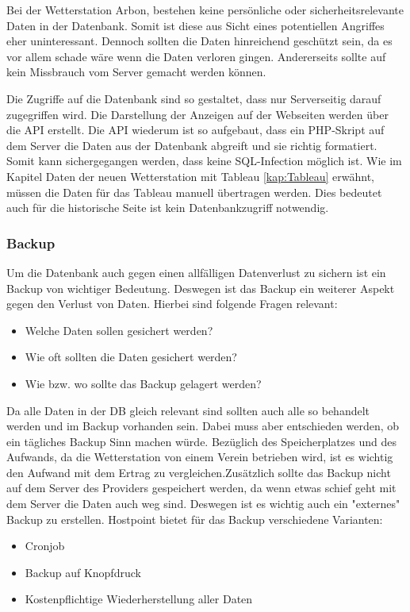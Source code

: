 Bei der Wetterstation Arbon, bestehen keine persönliche oder sicherheitsrelevante Daten in der Datenbank. Somit ist diese aus Sicht eines potentiellen Angriffes eher uninteressant. Dennoch sollten die Daten hinreichend geschützt sein, da es vor allem schade wäre wenn die Daten verloren gingen. Andererseits sollte auf kein Missbrauch vom Server gemacht werden können.

Die Zugriffe auf die Datenbank sind so gestaltet, dass nur Serverseitig darauf zugegriffen wird. Die Darstellung der Anzeigen auf der Webseiten werden über die API erstellt. Die API wiederum ist so aufgebaut, dass ein PHP-Skript auf dem Server die Daten aus der Datenbank abgreift und sie richtig formatiert. Somit kann sichergegangen werden, dass keine SQL-Infection möglich ist. Wie im Kapitel Daten der neuen Wetterstation mit Tableau \ref{kap:Tableau} erwähnt, müssen die Daten für das Tableau manuell übertragen werden. Dies bedeutet auch für die historische Seite ist kein Datenbankzugriff notwendig.

\subsubsection{Backup}
Um die Datenbank auch gegen einen allfälligen Datenverlust zu sichern ist ein Backup von wichtiger Bedeutung. Deswegen ist das Backup ein weiterer Aspekt gegen den Verlust von Daten. Hierbei sind folgende Fragen relevant:
\begin{itemize}
\item Welche Daten sollen gesichert werden?
\item Wie oft sollten die Daten gesichert werden?
\item Wie bzw. wo sollte das Backup gelagert werden?
\end{itemize}

Da alle Daten in der DB gleich relevant sind sollten auch alle so behandelt werden und im Backup vorhanden sein. Dabei muss aber entschieden werden, ob ein tägliches Backup Sinn machen würde. Bezüglich des Speicherplatzes und des Aufwands, da die Wetterstation von einem Verein betrieben wird, ist es wichtig den Aufwand mit dem Ertrag zu vergleichen.Zusätzlich sollte das Backup nicht auf dem Server des Providers gespeichert werden, da wenn etwas schief geht mit dem Server die Daten auch weg sind. Deswegen ist es wichtig auch ein "externes" Backup zu erstellen. Hostpoint bietet für das Backup verschiedene Varianten:
\begin{itemize}
\item Cronjob
\item Backup auf Knopfdruck
\item Kostenpflichtige Wiederherstellung aller Daten
\end{itemize}


